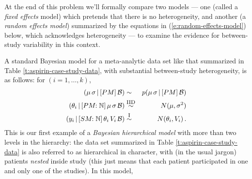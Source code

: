 \documentclass[12pt]{article}
\newcommand{\given}{\, | \,}
\begin{document}
\begin{itemize}
\begin{itemize}
\end{itemize}

\end{itemize}

At the end of this problem we'll formally compare two models --- one (called a \textit{fixed effects} model) which pretends that there is no heterogeneity, and another (a \textit{random effects model}) summarized by the equations in (\ref{e:random-effects-model}) below, which acknowledges heterogeneity --- to examine the evidence for between-study variability in this context.

A standard Bayesian model for a meta-analytic data set like that summarized in Table \ref{t:aspirin-case-study-data}, with substantial between-study heterogeneity, is as follows: for $( i = 1, \dots, k )$,
\begin{eqnarray} \label{e:random-effects-model}
( \mu \, \sigma \given [ PM ] \, \mathcal{ B } ) & \sim & p ( \mu \, \sigma \given [ PM ] \, \mathcal{ B } ) \nonumber \\
( \theta_i \given [ PM \! \! : \mathbb{ N } ] \, \mu \, \sigma \, \mathcal{ B } ) & \stackrel{  \textrm{\footnotesize IID} }{ \sim } & N ( \mu, \sigma^2 ) \nonumber \\
( y_i \given [ SM \! \! : \mathbb{ N } ] \, \theta_i \, V_i \, \mathcal{ B } ) & \stackrel{ \textrm{\footnotesize I} }{ \sim } & N ( \theta_i, V_i ) \, .
\end{eqnarray}
This is our first example of a \textit{Bayesian hierarchical model} with more than two levels in the hierarchy: the data set summarized in Table \ref{t:aspirin-case-study-data} is also referred to as hierarchical in character, with (in the usual jargon) patients \textit{nested} inside study (this just means that each patient participated in one and only one of the studies). In this model, 
\end{document}
